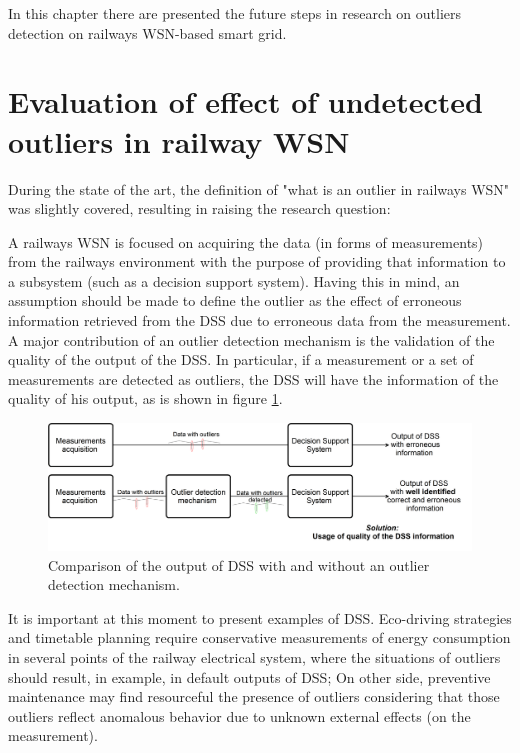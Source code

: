 In this chapter there are presented the future steps in research on outliers detection on railways WSN-based smart grid.


\section{Evaluation of effect of undetected outliers in railway WSN}


During the state of the art, the definition of "what is an outlier in railways WSN" was slightly covered, resulting in raising the research question:


A railways WSN is focused on acquiring the data (in forms of measurements) from the railways environment with the purpose of providing that information to a subsystem (such as a decision support system). Having this in mind, an assumption should be made to define the outlier as the effect of erroneous information retrieved from the DSS due to erroneous data from the measurement. A major contribution of an outlier detection mechanism is the validation of the quality of the output of the DSS. In particular, if a measurement or a set of measurements are detected as outliers, the DSS will have the information of the quality of his output, as is shown in figure \ref{fig:evaluation}.

\begin{figure}[h!]
	\centering
	\includegraphics[width=1.03\textwidth,keepaspectratio]{figures/evaluation}
	\caption{Comparison of the output of DSS with and without an outlier detection mechanism. }
	\label{fig:evaluation}
\end{figure}

It is important at this moment to present examples of DSS. Eco-driving strategies and timetable planning require conservative measurements of energy consumption in several points of the railway electrical system, where the situations of outliers should result, in example, in default outputs of DSS; On other side, preventive maintenance may find resourceful the presence of outliers considering that those outliers reflect anomalous behavior due to unknown external effects (on the measurement).

